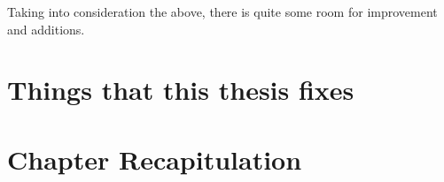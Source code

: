 \documentclass[thesis-solanki.tex]{subfiles}
\begin{document}
Taking into consideration the above, there is quite some room for improvement and additions.

\section{Things that this thesis fixes}\label{sec:things-fixed}


\section{Chapter Recapitulation}


\ifMain
\begin{scope}
  \nolinenumbers
  \enotesize
  \par
  \begin{singlespace}
  \setlength{\parskip}{12pt plus 2pt minus 1pt}
  \theendnotes
  \par
  \end{singlespace}
\end{scope}
\fi
\end{document}
